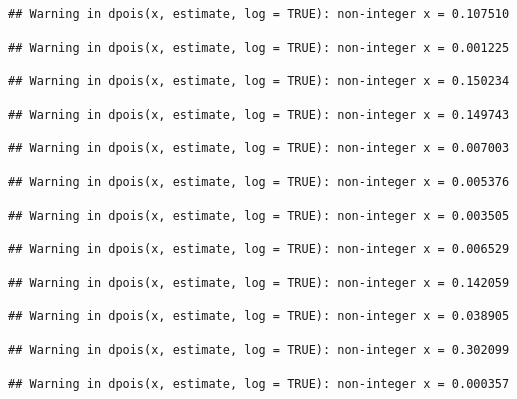 \documentclass[]{article}
\begin{document}
\begin{verbatim}
## Warning in dpois(x, estimate, log = TRUE): non-integer x = 0.107510
\end{verbatim}

\begin{verbatim}
## Warning in dpois(x, estimate, log = TRUE): non-integer x = 0.001225
\end{verbatim}

\begin{verbatim}
## Warning in dpois(x, estimate, log = TRUE): non-integer x = 0.150234
\end{verbatim}

\begin{verbatim}
## Warning in dpois(x, estimate, log = TRUE): non-integer x = 0.149743
\end{verbatim}

\begin{verbatim}
## Warning in dpois(x, estimate, log = TRUE): non-integer x = 0.007003
\end{verbatim}

\begin{verbatim}
## Warning in dpois(x, estimate, log = TRUE): non-integer x = 0.005376
\end{verbatim}

\begin{verbatim}
## Warning in dpois(x, estimate, log = TRUE): non-integer x = 0.003505
\end{verbatim}

\begin{verbatim}
## Warning in dpois(x, estimate, log = TRUE): non-integer x = 0.006529
\end{verbatim}

\begin{verbatim}
## Warning in dpois(x, estimate, log = TRUE): non-integer x = 0.142059
\end{verbatim}

\begin{verbatim}
## Warning in dpois(x, estimate, log = TRUE): non-integer x = 0.038905
\end{verbatim}

\begin{verbatim}
## Warning in dpois(x, estimate, log = TRUE): non-integer x = 0.302099
\end{verbatim}

\begin{verbatim}
## Warning in dpois(x, estimate, log = TRUE): non-integer x = 0.000357
\end{verbatim}
\end{document}
